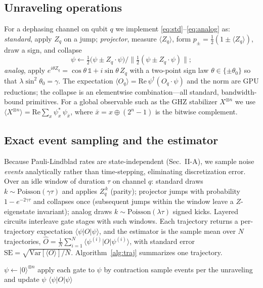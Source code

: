 \documentclass{ieeeaccess}
\newcommand{\ket}[1]{\lvert #1 \rangle}
\newcommand{\expv}[1]{\langle #1 \rangle}
\begin{document}
\subsection{Unraveling operations}
For a dephasing channel on qubit $q$ we implement \eqref{eq:std}--\eqref{eq:analog} as:
\emph{standard}, apply $Z_q$ on a jump; \emph{projector}, measure
$\langle Z_q\rangle$, form $p_\pm=\tfrac{1}{2}(1\pm\langle Z_q\rangle)$, draw a sign, and
collapse
\begin{equation}
\psi \leftarrow \tfrac{1}{2}\big(\psi \pm Z_q\!\cdot\!\psi\big)\big/\big\|\tfrac{1}{2}(\psi \pm Z_q\!\cdot\!\psi)\big\|;
\end{equation}
\emph{analog}, apply $e^{i\theta Z_q}=\cos\theta\,\mathbb{1}+i\sin\theta\,Z_q$ with a two-point
sign law $\theta\in\{\pm\theta_0\}$ so that $\lambda\sin^2\theta_0=\gamma$. The expectation
$\langle O_q\rangle=\mathrm{Re}\,\psi^\dagger (O_q\!\cdot\!\psi)$ and the norm are GPU reductions;
the collapse is an elementwise combination---all standard, bandwidth-bound primitives. For a
global observable such as the GHZ stabilizer $X^{\otimes n}$ we use
$\langle X^{\otimes n}\rangle = \mathrm{Re}\sum_x \psi_x^{*}\,\psi_{\bar x}$, where
$\bar x = x \oplus (2^n\!-\!1)$ is the bitwise complement.

\subsection{Exact event sampling and the estimator}
Because Pauli-Lindblad rates are state-independent (Sec.~II-A), we sample noise \emph{events}
analytically rather than time-stepping, eliminating discretization error. Over an idle window of
duration $\tau$ on channel $q$: standard draws $k\sim\mathrm{Poisson}(\gamma\tau)$ and applies
$Z_q^{\,k}$ (parity); projector jumps with probability $1-e^{-2\gamma\tau}$ and collapses once
(subsequent jumps within the window leave a $Z$-eigenstate invariant); analog draws
$k\sim\mathrm{Poisson}(\lambda\tau)$ signed kicks. Layered circuits interleave gate stages with
such windows. Each trajectory returns a per-trajectory expectation $\expv{\psi|O|\psi}$, and the
estimator is the sample mean over $N$ trajectories,
$\hat O = \tfrac{1}{N}\sum_{i=1}^{N}\expv{\psi^{(i)}|O|\psi^{(i)}}$, with standard error
$\mathrm{SE}=\sqrt{\mathrm{Var}[\expv{O}]/N}$. Algorithm~\ref{alg:traj} summarizes one trajectory.

\begin{algorithm}[t]
\caption{One trajectory (layered circuit, unraveling $\in\{$std, proj, analog$\}$)}
\label{alg:traj}
\begin{algorithmic}[1]
\State $\psi \leftarrow \ket{0}^{\otimes n}$
   apply each gate to $\psi$ by contraction
      \State sample events per the unraveling and update $\psi$
    \EndFor
  \EndIf
\EndFor
\State \Return $\expv{\psi|O|\psi}$
\end{algorithmic}
\end{algorithm}
\end{document}
